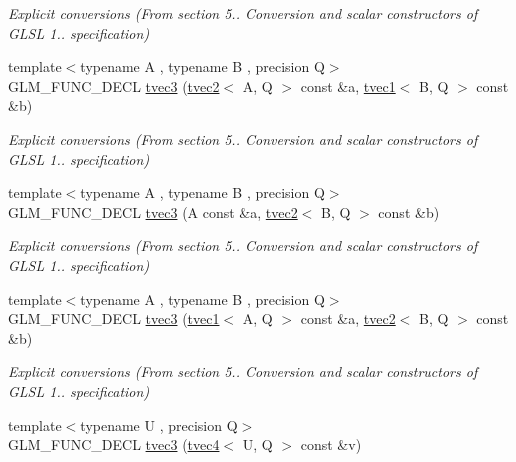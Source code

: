 \begin{DoxyCompactItemize}
\begin{DoxyCompactList}\small\item\em Explicit conversions (From section 5.. Conversion and scalar constructors of G\-L\-S\-L 1.. specification) \end{DoxyCompactList}\item 
\hypertarget{structglm_1_1tvec3_a1cede1ff2a5ced1c90c9b81fafcc9e00}{{\footnotesize template$<$typename A , typename B , precision Q$>$ }\\G\-L\-M\-\_\-\-F\-U\-N\-C\-\_\-\-D\-E\-C\-L \hyperlink{structglm_1_1tvec3_a1cede1ff2a5ced1c90c9b81fafcc9e00}{tvec3} (\hyperlink{structglm_1_1tvec2}{tvec2}$<$ A, Q $>$ const \&a, \hyperlink{structglm_1_1tvec1}{tvec1}$<$ B, Q $>$ const \&b)}\label{structglm_1_1tvec3_a1cede1ff2a5ced1c90c9b81fafcc9e00}

\begin{DoxyCompactList}\small\item\em Explicit conversions (From section 5.. Conversion and scalar constructors of G\-L\-S\-L 1.. specification) \end{DoxyCompactList}\item 
\hypertarget{structglm_1_1tvec3_aa9171bfdd41eb93ee43b8c89b8a72bf9}{{\footnotesize template$<$typename A , typename B , precision Q$>$ }\\G\-L\-M\-\_\-\-F\-U\-N\-C\-\_\-\-D\-E\-C\-L \hyperlink{structglm_1_1tvec3_aa9171bfdd41eb93ee43b8c89b8a72bf9}{tvec3} (A const \&a, \hyperlink{structglm_1_1tvec2}{tvec2}$<$ B, Q $>$ const \&b)}\label{structglm_1_1tvec3_aa9171bfdd41eb93ee43b8c89b8a72bf9}

\begin{DoxyCompactList}\small\item\em Explicit conversions (From section 5.. Conversion and scalar constructors of G\-L\-S\-L 1.. specification) \end{DoxyCompactList}\item 
\hypertarget{structglm_1_1tvec3_a3e1f8666e4cfe343b86b7610e05a7cb6}{{\footnotesize template$<$typename A , typename B , precision Q$>$ }\\G\-L\-M\-\_\-\-F\-U\-N\-C\-\_\-\-D\-E\-C\-L \hyperlink{structglm_1_1tvec3_a3e1f8666e4cfe343b86b7610e05a7cb6}{tvec3} (\hyperlink{structglm_1_1tvec1}{tvec1}$<$ A, Q $>$ const \&a, \hyperlink{structglm_1_1tvec2}{tvec2}$<$ B, Q $>$ const \&b)}\label{structglm_1_1tvec3_a3e1f8666e4cfe343b86b7610e05a7cb6}

\begin{DoxyCompactList}\small\item\em Explicit conversions (From section 5.. Conversion and scalar constructors of G\-L\-S\-L 1.. specification) \end{DoxyCompactList}\item 
\hypertarget{structglm_1_1tvec3_a00c684cea5f41272045e8e601d215b43}{{\footnotesize template$<$typename U , precision Q$>$ }\\G\-L\-M\-\_\-\-F\-U\-N\-C\-\_\-\-D\-E\-C\-L \hyperlink{structglm_1_1tvec3_a00c684cea5f41272045e8e601d215b43}{tvec3} (\hyperlink{structglm_1_1tvec4}{tvec4}$<$ U, Q $>$ const \&v)}\label{structglm_1_1tvec3_a00c684cea5f41272045e8e601d215b43}


\end{DoxyCompactItemize}
